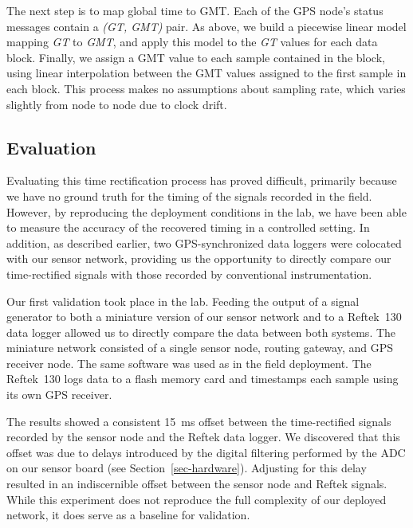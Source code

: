 The next step is to map global time to GMT. Each of the GPS node's status
messages contain a {\em (GT, GMT)} pair. As above, we build a piecewise
linear model mapping {\em GT} to {\em GMT}, and apply this model to the {\em
GT} values for each data block. Finally, we assign a GMT value to each sample
contained in the block, using linear interpolation between the GMT values
assigned to the first sample in each block.  This process makes no
assumptions about sampling rate, which varies slightly from node to node due
to clock drift.

\subsection{Evaluation}
\label{timing-postdeployment}

Evaluating this time rectification process has proved
difficult, primarily because we have no ground truth for the timing
of the signals recorded in the field. However, by reproducing the deployment
conditions in the lab, we have been able to measure the accuracy of the
recovered timing in a controlled setting. In addition, as described earlier,
two GPS-synchronized data loggers were colocated with our sensor network,
providing us the opportunity to directly compare our time-rectified signals
with those recorded by conventional instrumentation.

Our first validation took place in the lab. Feeding the
output of a signal generator to both a miniature version of our sensor
network and to a Reftek~130 data logger allowed us to directly compare the data
between both systems.  The miniature network consisted of a single
sensor node, routing gateway, and GPS receiver node. The same software was
used as in the field deployment. The Reftek~130 logs data
to a flash memory card and timestamps each sample using its own GPS receiver.

The results showed a consistent 15~ms offset between the time-rectified 
signals recorded by the sensor node and the Reftek data logger.  
We discovered that this offset was due to delays introduced by 
the digital filtering performed by the
ADC on our sensor board (see Section~\ref{sec-hardware}). Adjusting for this
delay resulted in an indiscernible offset between the sensor node and 
Reftek signals. While this experiment does not reproduce the full 
complexity of our deployed network, it does serve as a baseline for 
validation.


